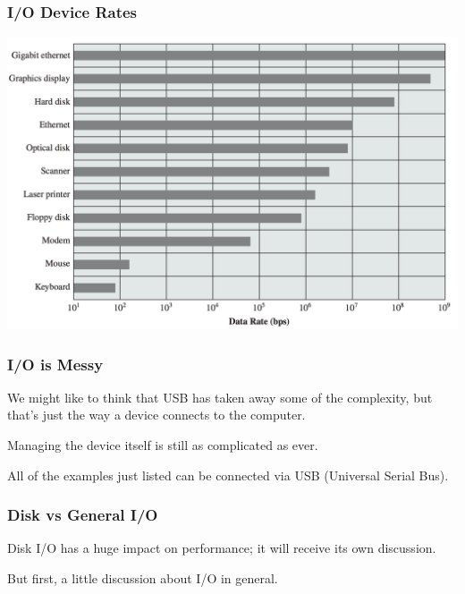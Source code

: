 \begin{frame}
\frametitle{I/O Device Rates}

\begin{center}
	\includegraphics[width=\textwidth]{images/io-device-rates.png}
\end{center}


\end{frame}

\begin{frame}
\frametitle{I/O is Messy}

We might like to think that USB has taken away some of the complexity, but that's just the way a device connects to the computer. 

Managing the device itself is still as complicated as ever. 

All of the examples just listed can be connected via USB (Universal Serial Bus). 


\end{frame}

\begin{frame}
\frametitle{Disk vs General I/O}

Disk I/O has a huge impact on performance; it will receive its own discussion. 

But first, a little discussion about I/O in general.

\end{frame}

